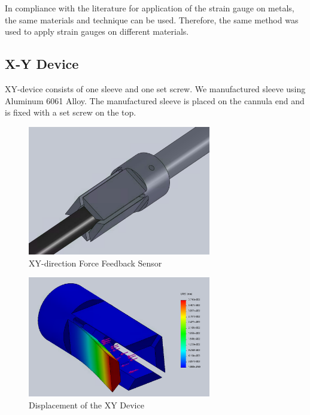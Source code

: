 	In compliance with the literature \cite{StrGugeInst} for application of the strain gauge on metals, the same materials and technique can be used. Therefore, the same method was used to apply strain gauges on different materials.

\subsection{X-Y Device}
\label{sec:xyDir}

XY-device consists of one sleeve and one set screw. We manufactured sleeve using Aluminum 6061 Alloy. %
The manufactured sleeve is placed on the cannula end and is fixed with a set screw on the top.

\begin{figure}[h]
	\begin{center}
		\includegraphics[width=80mm]{fig/methods/xy_dev_cl.png}
	\end{center}
	\vspace{-4mm}
	\caption[XY-direction Force Feedback Sensor]
	{XY-direction Force Feedback Sensor}
	\label{fig:xy-direction}
	\vspace{-2mm}
\end{figure}

\begin{figure}[h]
	\begin{center}
		\includegraphics[width=80mm]{fig/methods/old_sleeve_displ.png}
	\end{center}
	\vspace{-4mm}
	\caption[Displacement of the XY Device]
	{Displacement of the XY Device}
	\label{fig:xy-displ}
	\vspace{-2mm}
\end{figure}

